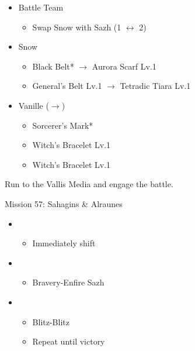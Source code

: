 \begin{menu}
	\begin{itemize}
	\paradigm
		\begin{itemize}
			\item Battle Team
				\begin{itemize}
					\item Swap Snow with Sazh (1 $\leftrightarrow$ 2)
				\end{itemize}
		\end{itemize}
	\equip
		\begin{itemize}
			\item Snow
				\begin{itemize}
					\item Black Belt* $\rightarrow$ Aurora Scarf Lv.1
					\item General's Belt Lv.1 $\rightarrow$ Tetradic Tiara Lv.1
				\end{itemize}
			\item Vanille ($\rightarrow$)
				\begin{itemize}
					\item Sorcerer's Mark*
					\item Witch's Bracelet Lv.1
					\item Witch's Bracelet Lv.1
				\end{itemize}
		\end{itemize}
	\end{itemize}
\end{menu}

Run to the Vallis Media and engage the battle.

\begin{battle}{Mission 57: Sahagins \& Alraunes}
	\begin{itemize}
		\item \sixth
			\begin{itemize}
				\item Immediately shift
			\end{itemize}
		\item \fourth
			\begin{itemize}
				\item Bravery-Enfire Sazh
			\end{itemize}
		\item \first
			\begin{itemize}
				\item Blitz-Blitz
				\item Repeat until victory
			\end{itemize}
	\end{itemize}
\end{battle}

